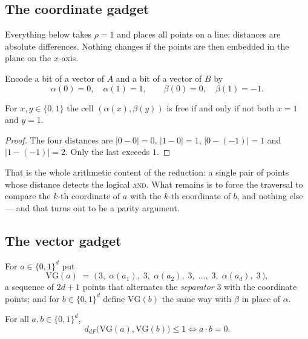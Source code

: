 \subsection{The coordinate gadget}

Everything below takes $\rho = 1$ and places all points on a line; distances
are absolute differences. Nothing changes if the points are then embedded in
the plane on the $x$-axis.

Encode a bit of a vector of $A$ and a bit of a vector of $B$ by
\[ \alpha(0) = 0, \quad \alpha(1) = 1, \qquad
   \beta(0) = 0, \quad \beta(1) = -1. \]

\begin{lemma}\label{lem:frechet-coordinate}
For $x,y \in \{0,1\}$ the cell $(\alpha(x), \beta(y))$ is free if and only if
not both $x = 1$ and $y = 1$.
\end{lemma}

\begin{proof}
The four distances are $|0-0| = 0$, $|1-0| = 1$, $|0-(-1)| = 1$ and
$|1-(-1)| = 2$. Only the last exceeds $1$.
\end{proof}

That is the whole arithmetic content of the reduction: a single pair of points
whose distance detects the logical \textsc{and}. What remains is to force the
traversal to compare the $k$-th coordinate of $a$ with the $k$-th coordinate of
$b$, and nothing else --- and that turns out to be a parity argument.

\subsection{The vector gadget}

\begin{definition}\label{def:frechet-vector-gadget}
For $a \in \{0,1\}^d$ put
\[ \mathrm{VG}(a) \;=\; \bigl(\, 3,\; \alpha(a_1),\; 3,\; \alpha(a_2),\; 3,\;
   \ldots,\; 3,\; \alpha(a_d),\; 3 \,\bigr), \]
a sequence of $2d+1$ points that alternates the \emph{separator} $3$ with the
coordinate points; and for $b \in \{0,1\}^d$ define $\mathrm{VG}(b)$ the same
way with $\beta$ in place of $\alpha$.
\end{definition}

\begin{lemma}\label{lem:frechet-vector-gadget}
For all $a,b \in \{0,1\}^d$,
\[ d_{dF}\bigl(\mathrm{VG}(a), \mathrm{VG}(b)\bigr) \le 1
   \iff a \cdot b = 0 . \]
\end{lemma}

